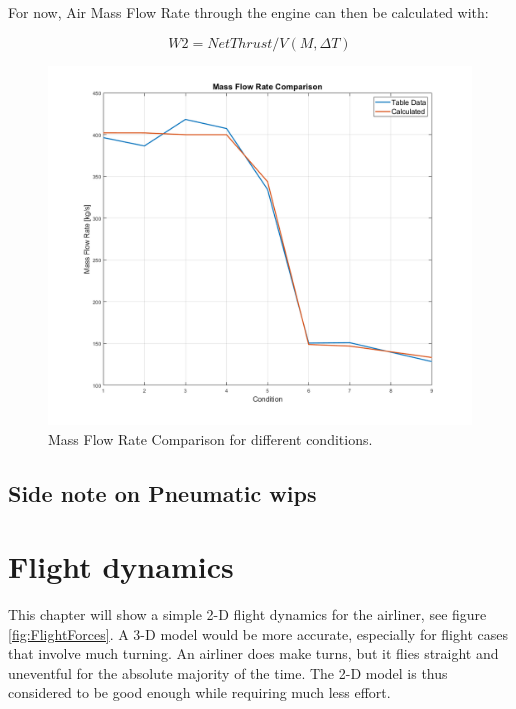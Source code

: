 \documentclass[english]{kththesis}
\begin{document}
For now, Air Mass Flow Rate through the engine can then be calculated with:

$$W2 = Net Thrust/V(M,\Delta T)$$

\begin{figure}[hb]
    \centering
    \includegraphics[width=1\textwidth]{Epictures/MassFlowRateComparison.png}
    \caption{Mass Flow Rate Comparison for different conditions.}
    \label{fig:MassFlowRateComparison}
\end{figure}


\clearpage







\section{Side note on Pneumatic \acrshort{wips}}

\cleardoublepage
\chapter{Flight dynamics}
\label{ch:flightdynamics}

This chapter will show a simple 2-D flight dynamics for the airliner, see figure \ref{fig:FlightForces}. A 3-D model would be more accurate, especially for flight cases that involve much turning. An airliner does make turns, but it flies straight and uneventful for the absolute majority of the time. The 2-D model is thus considered to be good enough while requiring much less effort.
\end{document}

